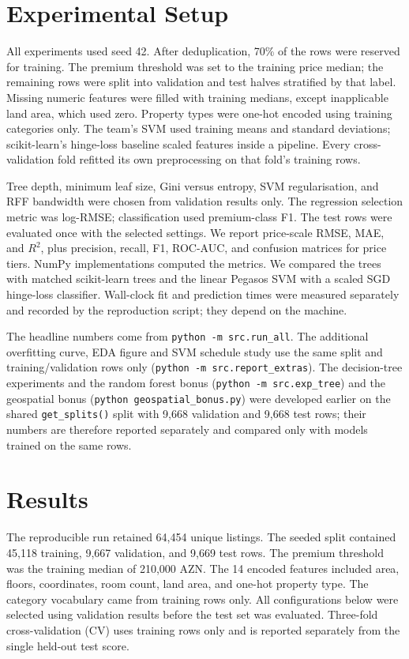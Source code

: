 \documentclass[10pt,twocolumn,a4paper]{article}
\begin{document}
\section{Experimental Setup}
All experiments used seed 42. After deduplication, 70\% of the rows were
reserved for training. The premium threshold was set to the training
price median; the remaining rows were split into validation and test
halves stratified by that label. Missing numeric features were filled
with training medians, except inapplicable land area, which used zero.
Property types were one-hot encoded using training categories only.
The team's SVM used training means and standard
deviations; scikit-learn's hinge-loss baseline scaled features inside
a pipeline. Every cross-validation fold refitted its own preprocessing
on that fold's training rows.

Tree depth, minimum leaf size, Gini versus entropy, SVM regularisation,
and RFF bandwidth were chosen from validation results only. The regression
selection metric was log-RMSE; classification used premium-class F1.
The test rows were evaluated once with the selected settings. We report
price-scale RMSE, MAE, and $R^2$, plus precision, recall, F1, ROC-AUC,
and confusion matrices for price tiers. NumPy implementations computed
the metrics. We compared the trees with matched scikit-learn trees and
the linear Pegasos SVM with a scaled SGD hinge-loss classifier. Wall-clock
fit and prediction times were measured separately and recorded by the
reproduction script; they depend on the machine.

The headline numbers come from \texttt{python -m src.run\_all}. The
additional overfitting curve, EDA figure and SVM schedule study use the
same split and training/validation rows only
(\texttt{python -m src.report\_extras}). The decision-tree experiments
and the random forest bonus (\texttt{python -m src.exp\_tree}) and the
geospatial bonus (\texttt{python geospatial\_bonus.py}) were developed
earlier on the shared \texttt{get\_splits()} split with 9,668 validation
and 9,668 test rows; their numbers are therefore reported separately and
compared only with models trained on the same rows.

\section{Results}
The reproducible run retained 64,454 unique listings. The seeded split
contained 45,118 training, 9,667 validation, and 9,669 test rows. The
premium threshold was the training median of 210,000 AZN. The 14 encoded
features included area, floors, coordinates, room count, land area, and
one-hot property type. The category vocabulary came from training rows only.
All configurations below were selected using validation results before
the test set was evaluated. Three-fold cross-validation (CV) uses training
rows only and is reported separately from the single held-out test score.
\end{document}

